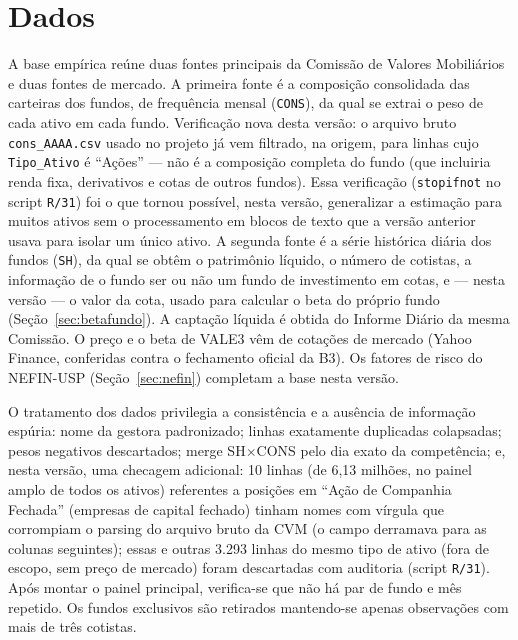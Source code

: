 \documentclass[12pt,a4paper]{article}
\begin{document}
\section{Dados}
\label{sec:dados}

A base empírica reúne duas fontes principais da Comissão de Valores Mobiliários e duas fontes de
mercado. A primeira fonte é a composição consolidada das carteiras dos fundos, de frequência
mensal (\texttt{CONS}), da qual se extrai o peso de cada ativo em cada fundo. Verificação nova
desta versão: o arquivo bruto \texttt{cons\_AAAA.csv} usado no projeto já vem filtrado, na
origem, para linhas cujo \texttt{Tipo\_Ativo} é ``Ações'' --- não é a composição completa do
fundo (que incluiria renda fixa, derivativos e cotas de outros fundos). Essa verificação
(\texttt{stopifnot} no script \texttt{R/31}) foi o que tornou possível, nesta versão, generalizar
a estimação para muitos ativos sem o processamento em blocos de texto que a versão anterior
usava para isolar um único ativo. A segunda fonte é a série histórica diária dos fundos
(\texttt{SH}), da qual se obtêm o patrimônio líquido, o número de cotistas, a informação de o
fundo ser ou não um fundo de investimento em cotas, e --- nesta versão --- o valor da cota, usado
para calcular o beta do próprio fundo (Seção~\ref{sec:betafundo}). A captação líquida é obtida do
Informe Diário da mesma Comissão. O preço e o beta de VALE3 vêm de cotações de mercado (Yahoo
Finance, conferidas contra o fechamento oficial da B3). Os fatores de risco do NEFIN-USP
(Seção~\ref{sec:nefin}) completam a base nesta versão.

O tratamento dos dados privilegia a consistência e a ausência de informação espúria: nome da
gestora padronizado; linhas exatamente duplicadas colapsadas; pesos negativos descartados;
merge SH$\times$CONS pelo dia exato da competência; e, nesta versão, uma checagem adicional: 10
linhas (de 6,13 milhões, no painel amplo de todos os ativos) referentes a posições em ``Ação de
Companhia Fechada'' (empresas de capital fechado) tinham nomes com vírgula que corrompiam o
parsing do arquivo bruto da CVM (o campo derramava para as colunas seguintes); essas e outras
3.293 linhas do mesmo tipo de ativo (fora de escopo, sem preço de mercado) foram descartadas com
auditoria (script \texttt{R/31}). Após montar o painel principal, verifica-se que não há par de
fundo e mês repetido. Os fundos exclusivos são retirados mantendo-se apenas observações com mais
de três cotistas.
\end{document}
